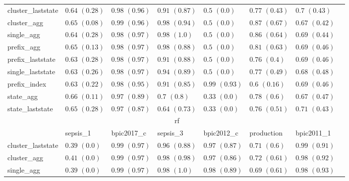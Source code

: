 \documentclass[twoside,11pt]{Latex/Classes/PhDthesisPSnPDF}
\begin{document}
\begin{table}[h]
{\begin{tabular}{llllllll}
			\\ \midrule
			cluster\_laststate & $0.64$ ${(0.28)}$ & $\mathbf{0.98}$ $\mathbf{(0.96)}$  & $0.91$ ${(0.87)}$ & $0.5$ ${(0.0)}$ & $0.77$ ${(0.43)}$ & $0.7$ ${(0.43)}$ \\
			cluster\_agg & $0.65$ ${(0.08)}$ & $0.99$ ${(0.96)}$ & $\mathbf{0.98}$ $\mathbf{(0.94)}$  & $0.5$ ${(0.0)}$ & $\mathbf{0.87}$ $\mathbf{(0.67)}$  & $0.67$ ${(0.42)}$ \\
			single\_agg & $0.64$ ${(0.28)}$ & $0.98$ ${(0.97)}$ & $\mathbf{0.98}$ $\mathbf{(1.0)}$  & $0.5$ ${(0.0)}$ & $0.86$ ${(0.64)}$ & $0.69$ ${(0.44)}$ \\
			prefix\_agg & $0.65$ ${(0.13)}$ & $0.98$ ${(0.97)}$ & $\mathbf{0.98}$ $\mathbf{(0.88)}$  & $0.5$ ${(0.0)}$ & $0.81$ ${(0.63)}$ & $0.69$ ${(0.46)}$ \\
			prefix\_laststate & $0.63$ ${(0.28)}$ & $\mathbf{0.98}$ $\mathbf{(0.97)}$  & $0.91$ ${(0.88)}$ & $0.5$ ${(0.0)}$ & $0.76$ ${(0.4)}$ & $0.69$ ${(0.46)}$ \\
			single\_laststate & $0.63$ ${(0.26)}$ & $\mathbf{0.98}$ $\mathbf{(0.97)}$  & $0.94$ ${(0.89)}$ & $0.5$ ${(0.0)}$ & $0.77$ ${(0.49)}$ & $0.68$ ${(0.48)}$ \\
			prefix\_index & $0.63$ ${(0.22)}$ & $\mathbf{0.98}$ $\mathbf{(0.95)}$  & $0.91$ ${(0.85)}$ & $0.99$ ${(0.93)}$ & $0.6$ ${(0.16)}$ & $0.69$ ${(0.46)}$ \\
			state\_agg & $\mathbf{0.66}$ $\mathbf{(0.11)}$  & $0.97$ ${(0.89)}$ & $0.7$ ${(0.8)}$ & $0.33$ ${(0.0)}$ & $0.78$ ${(0.6)}$ & $0.67$ ${(0.47)}$ \\
			state\_laststate & $0.65$ ${(0.28)}$ & $0.97$ ${(0.87)}$ & $0.64$ ${(0.73)}$ & $0.33$ ${(0.0)}$ & $0.76$ ${(0.51)}$ & $0.71$ ${(0.43)}$ \\
			\bottomrule
			\toprule
			& \multicolumn{5}{c}{rf}
			\\
			& sepsis\_1 & bpic2017\_c & sepsis\_3 & bpic2012\_c & production & bpic2011\_1
			\\ \midrule
			cluster\_laststate & $0.39$ ${(0.0)}$ & $\mathbf{0.99}$ $\mathbf{(0.97)}$  & $0.96$ ${(0.88)}$ & $0.97$ ${(0.87)}$ & $0.71$ ${(0.6)}$ & $0.99$ ${(0.91)}$ \\
			cluster\_agg & $0.41$ ${(0.0)}$ & $\mathbf{0.99}$ $\mathbf{(0.97)}$  & $0.98$ ${(0.98)}$ & $0.97$ ${(0.86)}$ & $0.72$ ${(0.61)}$ & $\mathbf{0.98}$ $\mathbf{(0.92)}$  \\
			single\_agg & $0.39$ ${(0.0)}$ & $\mathbf{0.99}$ $\mathbf{(0.97)}$  & $\mathbf{0.98}$ $\mathbf{(1.0)}$  & $\mathbf{0.98}$ $\mathbf{(0.89)}$  & $0.69$ ${(0.61)}$ & $\mathbf{0.98}$ $\mathbf{(0.93)}$  \\

\end{tabular}}
\end{table}
\end{document}
